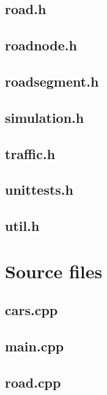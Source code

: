 \documentclass{article}
\begin{document}
  \subsection{road.h}
    
  \subsection{roadnode.h}
    
  \subsection{roadsegment.h}
    
  \subsection{simulation.h}
    
  \subsection{traffic.h}
    
  \subsection{unittests.h}
    
  \subsection{util.h}
    
\section{Source files}
  \subsection{cars.cpp}
    
  \subsection{main.cpp}
    
  \subsection{road.cpp}
    
\end{document}
